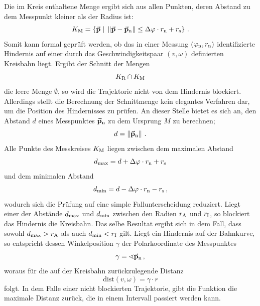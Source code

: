 Die im Kreis enthaltene Menge ergibt sich aus allen Punkten, deren Abstand zu dem Messpunkt kleiner als der Radius ist:
\begin{equation}
K_{\text{M}} = \left\{ \vec{\mathbf{p}} \hspace{1mm} \vert \hspace{1mm} \left\lVert\vec{\mathbf{p}}-\vec{\mathbf{p}}_{\text{n}}\right\rVert \leq \Delta\varphi\cdot r_{\text{n}} + r_{\text{s}}\right\}\,.
\end{equation}
Somit kann formal geprüft werden, ob das in einer Messung $(\varphi_{\text{n}},r_{\text{n}})$ identifizierte Hindernis auf einer durch das Geschwindigkeitspaar $(v,\omega)$ definierten Kreisbahn liegt. Ergibt der Schnitt der Mengen
\begin{equation}
K_{\text{R}} \cap K_{\text{M}}
\end{equation}
die leere Menge $\emptyset$, so wird die Trajektorie nicht von dem Hindernis blockiert. Allerdings stellt die Berechnung der Schnittmenge kein elegantes Verfahren dar, um die Position des Hindernisses zu prüfen. An dieser Stelle bietet es sich an, den Abstand $d$ eines Messpunktes $\vec{\mathbf{p}}_{\text{n}}$ zu dem Ursprung $M$ zu berechnen;
\begin{equation}
d = \left\lVert\vec{\mathbf{p}}_{\text{n}}\right\rVert\,.
\end{equation}
Alle Punkte des Messkreises $K_{\text{M}}$ liegen zwischen dem maximalen Abstand
\begin{equation}
d_{\text{max}} = d + \Delta\varphi\cdot r_{\text{n}} + r_{\text{s}}
\end{equation}
und dem minimalen Abstand
\begin{equation}
d_{\text{min}} = d - \Delta\varphi\cdot r_{\text{n}} - r_{\text{s}}\,,
\end{equation}
wodurch sich die Prüfung auf eine simple Fallunterscheidung reduziert. Liegt einer der Abstände $d_{\text{max}}$ und $d_{\text{min}}$ zwischen den Radien $r_{\text{A}}$ und $r_{\text{I}}$, so blockiert das Hindernis die Kreisbahn. Das selbe Resultat ergibt sich in dem Fall, dass sowohl $d_{\text{max}} > r_{\text{A}}$ als auch $d_{\text{min}} < r_{\text{I}}$ gilt. Liegt ein Hindernis auf der Bahnkurve, so entspricht dessen Winkelposition $\gamma$ der Polarkoordinate des Messpunktes
\begin{equation}
\gamma = \sphericalangle \vec{\mathbf{p}}_{\text{n}}\,,
\end{equation}
woraus für die auf der Kreisbahn zurückzulegende Distanz
\begin{equation}
\text{dist}(v, \omega) = \gamma \cdot r
\end{equation}
folgt. In dem Falle einer nicht blockierten Trajektorie, gibt die Funktion die maximale Distanz zurück, die in einem Intervall passiert werden kann.
